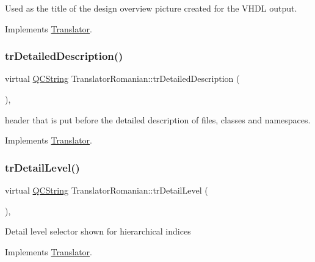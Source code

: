 Used as the title of the design overview picture created for the V\+H\+DL output. 

Implements \mbox{\hyperlink{class_translator}{Translator}}.

\mbox{\label{class_translator_romanian_abf513a20c63fc4a8b8239dce79c9dcca}} 
\subsubsection{\texorpdfstring{trDetailedDescription()}{trDetailedDescription()}}
{\footnotesize\ttfamily virtual \mbox{\hyperlink{class_q_c_string}{Q\+C\+String}} Translator\+Romanian\+::tr\+Detailed\+Description (\begin{DoxyParamCaption}{ }\end{DoxyParamCaption})\hspace{0.3cm}{\ttfamily [inline]}, {\ttfamily [virtual]}}

header that is put before the detailed description of files, classes and namespaces. 

Implements \mbox{\hyperlink{class_translator}{Translator}}.

\mbox{\label{class_translator_romanian_afd1d8a9754f23c09e716b88123d863d8}} 
\subsubsection{\texorpdfstring{trDetailLevel()}{trDetailLevel()}}
{\footnotesize\ttfamily virtual \mbox{\hyperlink{class_q_c_string}{Q\+C\+String}} Translator\+Romanian\+::tr\+Detail\+Level (\begin{DoxyParamCaption}{ }\end{DoxyParamCaption})\hspace{0.3cm}{\ttfamily [inline]}, {\ttfamily [virtual]}}

Detail level selector shown for hierarchical indices 

Implements \mbox{\hyperlink{class_translator}{Translator}}.

\mbox{\label{class_translator_romanian_aca87b34e214fb29b7f23c2c7fbbc6387}} 
